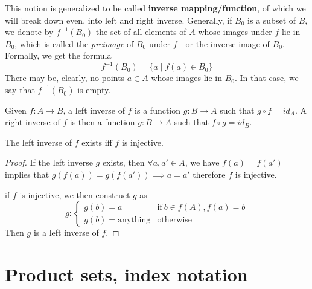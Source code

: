 This notion is generalized to be called \textbf{inverse mapping/function}, of which we will break down even, into left and right inverse. Generally, if $B_0$ is a subset of $B$, we denote by $f^{-1}(B_0)$ the set of all elements of $A$ whose images under $f$ lie in $B_0$, which is called the \textit{preimage} of $B_0$ under $f$ - or the inverse image of $B_0$.  Formally, we get the formula \begin{equation*}
    f^{-1}(B_0) = \{a\mid f(a)\in B_0\}
\end{equation*}
There may be, clearly, no points $a\in A$ whose images lie in $B_0$. In that case, we say that $f^{-1}(B_0)$ is empty. 

\begin{definition}
    Given $f: A\to B$, a left inverse of $f$ is a function $g: B \to A$ such that $g\circ f=id_{A}$. A right inverse of $f$ is then a function $g: B \to A$ such that $f\circ g=id_{B}$. 
\end{definition}

\begin{theorem}
    The left inverse of $f$ exists iff $f$ is injective. 
\end{theorem}
\begin{proof}
    If the left inverse $g$ exists, then $\forall a,a'\in A$, we have $f(a)=f(a')$ implies that $g(f(a))=g(f(a'))\implies a=a'$ therefore $f$ is injective. 

if $f$ is injective, we then construct $g$ as $$g:\begin{cases}
g(b)=a& \text{if} \: b\in f(A), f(a)=b \\
g(b)=\text{anything} & \text{otherwise}
\end{cases}$$
Then $g$ is a left inverse of $f$. 
\end{proof}
\section{Product sets, index notation}

